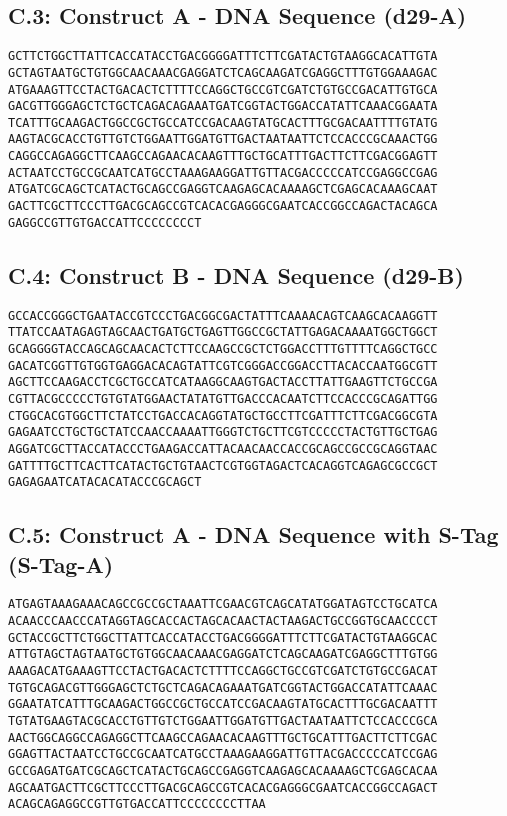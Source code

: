 \subsection*{C.3: Construct A - DNA Sequence (d29-A)}
\begin{verbatim}
GCTTCTGGCTTATTCACCATACCTGACGGGGATTTCTTCGATACTGTAAGGCACATTGTA
GCTAGTAATGCTGTGGCAACAAACGAGGATCTCAGCAAGATCGAGGCTTTGTGGAAAGAC
ATGAAAGTTCCTACTGACACTCTTTTCCAGGCTGCCGTCGATCTGTGCCGACATTGTGCA
GACGTTGGGAGCTCTGCTCAGACAGAAATGATCGGTACTGGACCATATTCAAACGGAATA
TCATTTGCAAGACTGGCCGCTGCCATCCGACAAGTATGCACTTTGCGACAATTTTGTATG
AAGTACGCACCTGTTGTCTGGAATTGGATGTTGACTAATAATTCTCCACCCGCAAACTGG
CAGGCCAGAGGCTTCAAGCCAGAACACAAGTTTGCTGCATTTGACTTCTTCGACGGAGTT
ACTAATCCTGCCGCAATCATGCCTAAAGAAGGATTGTTACGACCCCCATCCGAGGCCGAG
ATGATCGCAGCTCATACTGCAGCCGAGGTCAAGAGCACAAAAGCTCGAGCACAAAGCAAT
GACTTCGCTTCCCTTGACGCAGCCGTCACACGAGGGCGAATCACCGGCCAGACTACAGCA
GAGGCCGTTGTGACCATTCCCCCCCCT
\end{verbatim}
\subsection*{C.4: Construct B - DNA Sequence (d29-B)}
\begin{verbatim}
GCCACCGGGCTGAATACCGTCCCTGACGGCGACTATTTCAAAACAGTCAAGCACAAGGTT
TTATCCAATAGAGTAGCAACTGATGCTGAGTTGGCCGCTATTGAGACAAAATGGCTGGCT
GCAGGGGTACCAGCAGCAACACTCTTCCAAGCCGCTCTGGACCTTTGTTTTCAGGCTGCC
GACATCGGTTGTGGTGAGGACACAGTATTCGTCGGGACCGGACCTTACACCAATGGCGTT
AGCTTCCAAGACCTCGCTGCCATCATAAGGCAAGTGACTACCTTATTGAAGTTCTGCCGA
CGTTACGCCCCCTGTGTATGGAACTATATGTTGACCCACAATCTTCCACCCGCAGATTGG
CTGGCACGTGGCTTCTATCCTGACCACAGGTATGCTGCCTTCGATTTCTTCGACGGCGTA
GAGAATCCTGCTGCTATCCAACCAAAATTGGGTCTGCTTCGTCCCCCTACTGTTGCTGAG
AGGATCGCTTACCATACCCTGAAGACCATTACAACAACCACCGCAGCCGCCGCAGGTAAC
GATTTTGCTTCACTTCATACTGCTGTAACTCGTGGTAGACTCACAGGTCAGAGCGCCGCT
GAGAGAATCATACACATACCCGCAGCT
\end{verbatim}
\subsection*{C.5: Construct A - DNA Sequence with S-Tag (S-Tag-A)}
\begin{verbatim}
ATGAGTAAAGAAACAGCCGCCGCTAAATTCGAACGTCAGCATATGGATAGTCCTGCATCA
ACAACCCAACCCATAGGTAGCACCACTAGCACAACTACTAAGACTGCCGGTGCAACCCCT
GCTACCGCTTCTGGCTTATTCACCATACCTGACGGGGATTTCTTCGATACTGTAAGGCAC
ATTGTAGCTAGTAATGCTGTGGCAACAAACGAGGATCTCAGCAAGATCGAGGCTTTGTGG
AAAGACATGAAAGTTCCTACTGACACTCTTTTCCAGGCTGCCGTCGATCTGTGCCGACAT
TGTGCAGACGTTGGGAGCTCTGCTCAGACAGAAATGATCGGTACTGGACCATATTCAAAC
GGAATATCATTTGCAAGACTGGCCGCTGCCATCCGACAAGTATGCACTTTGCGACAATTT
TGTATGAAGTACGCACCTGTTGTCTGGAATTGGATGTTGACTAATAATTCTCCACCCGCA
AACTGGCAGGCCAGAGGCTTCAAGCCAGAACACAAGTTTGCTGCATTTGACTTCTTCGAC
GGAGTTACTAATCCTGCCGCAATCATGCCTAAAGAAGGATTGTTACGACCCCCATCCGAG
GCCGAGATGATCGCAGCTCATACTGCAGCCGAGGTCAAGAGCACAAAAGCTCGAGCACAA
AGCAATGACTTCGCTTCCCTTGACGCAGCCGTCACACGAGGGCGAATCACCGGCCAGACT
ACAGCAGAGGCCGTTGTGACCATTCCCCCCCCTTAA
\end{verbatim}
